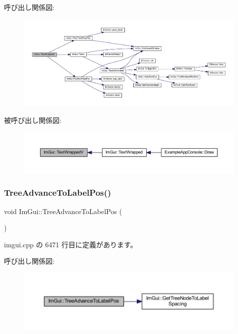 呼び出し関係図\+:\nopagebreak
\begin{figure}[H]
\begin{center}
\leavevmode
\includegraphics[width=350pt]{namespace_im_gui_a9019a388cd0c410bcb3d3ae63a008123_cgraph}
\end{center}
\end{figure}
被呼び出し関係図\+:\nopagebreak
\begin{figure}[H]
\begin{center}
\leavevmode
\includegraphics[width=350pt]{namespace_im_gui_a9019a388cd0c410bcb3d3ae63a008123_icgraph}
\end{center}
\end{figure}
\mbox{\label{namespace_im_gui_a54e15c2f65cea3aeddd66b5dcfb45716}} 
\subsubsection{\texorpdfstring{Tree\+Advance\+To\+Label\+Pos()}{TreeAdvanceToLabelPos()}}
{\footnotesize\ttfamily void Im\+Gui\+::\+Tree\+Advance\+To\+Label\+Pos (\begin{DoxyParamCaption}{ }\end{DoxyParamCaption})}



 imgui.\+cpp の 6471 行目に定義があります。

呼び出し関係図\+:\nopagebreak
\begin{figure}[H]
\begin{center}
\leavevmode
\includegraphics[width=350pt]{namespace_im_gui_a54e15c2f65cea3aeddd66b5dcfb45716_cgraph}
\end{center}
\end{figure}
\mbox{\label{namespace_im_gui_a4dff507ce8bbe0da9556bb50b1e60d7f}} 

